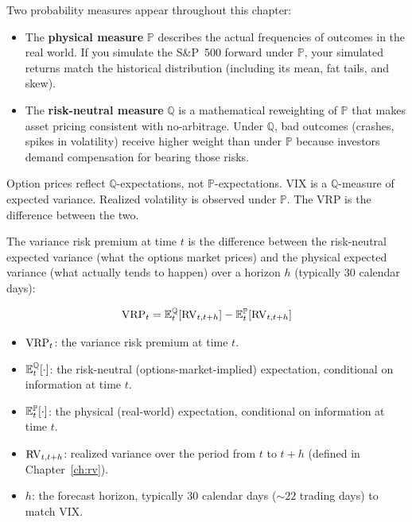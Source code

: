 \begin{prereq}
Two probability measures appear throughout this chapter:
\begin{itemize}[nosep]
  \item The \textbf{physical measure} $\mathbb{P}$ describes the actual frequencies of outcomes in the real world. If you simulate the S\&P~500 forward under $\mathbb{P}$, your simulated returns match the historical distribution (including its mean, fat tails, and skew).
  \item The \textbf{risk-neutral measure} $\mathbb{Q}$ is a mathematical reweighting of $\mathbb{P}$ that makes asset pricing consistent with no-arbitrage. Under $\mathbb{Q}$, bad outcomes (crashes, spikes in volatility) receive higher weight than under $\mathbb{P}$ because investors demand compensation for bearing those risks.
\end{itemize}
Option prices reflect $\mathbb{Q}$-expectations, not $\mathbb{P}$-expectations.
VIX is a $\mathbb{Q}$-measure of expected variance.
Realized volatility is observed under $\mathbb{P}$.
The VRP is the difference between the two.
\end{prereq}

The variance risk premium at time $t$ is the difference between the risk-neutral expected variance (what the options market prices) and the physical expected variance (what actually tends to happen) over a horizon $h$ (typically 30 calendar days):

\begin{definition}
\label{def:vrp}
\begin{equation}
  \operatorname{VRP}_t = \mathbb{E}^{\mathbb{Q}}_t\!\left[\operatorname{RV}_{t,t+h}\right] - \mathbb{E}^{\mathbb{P}}_t\!\left[\operatorname{RV}_{t,t+h}\right]
  \label{eq:vrp-theoretical}
\end{equation}
\begin{itemize}[nosep]
  \item $\operatorname{VRP}_t$: the variance risk premium at time $t$.
  \item $\mathbb{E}^{\mathbb{Q}}_t[\cdot]$: the risk-neutral (options-market-implied) expectation, conditional on information at time $t$.
  \item $\mathbb{E}^{\mathbb{P}}_t[\cdot]$: the physical (real-world) expectation, conditional on information at time $t$.
  \item $\operatorname{RV}_{t,t+h}$: realized variance over the period from $t$ to $t+h$ (defined in Chapter~\ref{ch:rv}).
  \item $h$: the forecast horizon, typically 30 calendar days (${\sim}22$ trading days) to match VIX.
\end{itemize}
\end{definition}

